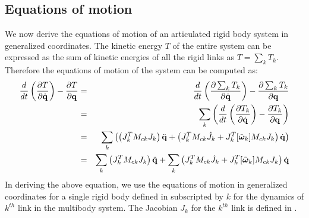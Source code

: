 \subsection{Equations of motion}
We now derive the equations of motion of an articulated rigid body system in generalized coordinates. The kinetic energy $T$ of the entire system can be expressed as the sum of kinetic energies of all the rigid links as $T=\sum_k T_k$. Therefore the equations of motion of the system can be computed as:
\begin{eqnarray}
\nonumber
\frac{d}{dt} \left ( \frac{\partial T}{\partial \dot{\mathbf{q}}} \right ) - \frac{\partial T}{\partial \mathbf{q}} & = & \frac{d}{dt} \left ( \frac{\partial \sum_k T_k}{\partial \dot{\mathbf{q}}} \right ) - \frac{\partial \sum_k T_k}{\partial \mathbf{q}}\\
\nonumber
& = & \sum_k \left ( \frac{d}{dt} \left ( \frac{\partial T_k}{\partial \dot{\mathbf{q}}} \right ) - \frac{\partial T_k}{\partial \mathbf{q}} \right )\\
\nonumber
& = & \sum_k \left ( \left( J_k^T M_{ck} J_k \right )\ddot{\mathbf{q}} + \left( J_k^T M_{ck} \dot{J}_k + J_k^T [\tilde{\bm{\omega}}_k]M_{ck} J_k \right )\dot{\mathbf{q}} \right )\\
& = &  \sum_k \left( J_k^T M_{ck} J_k \right )\ddot{\mathbf{q}} + \sum_k\left( J_k^T M_{ck} \dot{J}_k + J_k^T [\tilde{\bm{\omega}}_k]M_{ck} J_k \right )\dot{\mathbf{q}}
\end{eqnarray}
In deriving the above equation, we use the equations of motion in generalized coordinates for a single rigid body defined in  subscripted by $k$ for the dynamics of $k^{th}$ link in the multibody system. The Jacobian $J_k$ for the $k^{th}$ link is defined in .

